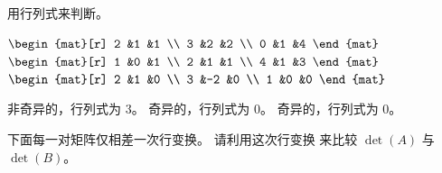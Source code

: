 \begin{exercises}
     用行列式来判断。
     \begin{exparts*}
       \partsitem \(
            \begin{mat}[r]
                2    &1   &1  \\
                3    &2   &2 \\
                0    &1   &4
            \end{mat}    \)
       \partsitem \(
            \begin{mat}[r]
                1    &0   &1  \\
                2    &1   &1 \\
                4    &1   &3
            \end{mat}    \)
       \partsitem \(
            \begin{mat}[r]
                2    &1   &0  \\
                3    &-2  &0 \\
                1    &0   &0
            \end{mat}    \)
     \end{exparts*}
     \begin{answer}
      \begin{exparts}
         \partsitem 非奇异的，行列式为 \( 3 \)。
         \partsitem 奇异的，行列式为 \( 0 \)。
         \partsitem 奇异的，行列式为 \( 0 \)。
       \end{exparts}  
     \end{answer}
  \recommended \item
    下面每一对矩阵仅相差一次行变换。
    请利用这次行变换
    来比较 \( \det(A) \) 与 \( \det(B) \)。
\end{exercises}

